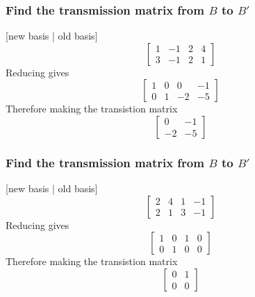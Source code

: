 \documentclass[12pt, a4paper]{article}
\begin{document}
			\subsubsection{Find the transmission matrix from $B$ to $B'$}
				[new basis | old basis]
				$$\begin{bmatrix}1 & -1 & 2 & 4\\3 & -1 & 2 & 1 \end{bmatrix}$$
				Reducing gives
				$$\begin{bmatrix}1 & 0 & 0 & -1 \\ 0 & 1 & -2 & -5 \end{bmatrix}$$
				Therefore making the transistion matrix
				$$\begin{bmatrix} 0 & -1 \\ -2 & -5 \end{bmatrix}$$
			\subsubsection{Find the transmission matrix from $B$ to $B'$}
				[new basis | old basis]
				$$\begin{bmatrix} 2 & 4 & 1 & -1 \\ 2 & 1 &3 & -1  \end{bmatrix}$$
				Reducing gives
				$$\begin{bmatrix}1 & 0 & 1 & 0 \\0 & 1 & 0 & 0 \end{bmatrix}$$
				Therefore making the transistion matrix
				$$\begin{bmatrix} 0 & 1 \\0 & 0 \end{bmatrix}$$
\end{document}
